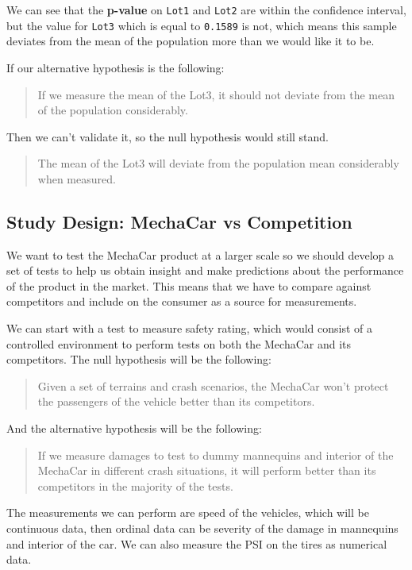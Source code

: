 \documentclass[11pt]{article}
\begin{document}
We can see that the \textbf{p-value} on \texttt{Lot1} and \texttt{Lot2} are within the confidence interval, but the value for \texttt{Lot3} which is equal to \texttt{0.1589} is not, which means this sample deviates from the mean of the population more than we would like it to be.

If our alternative hypothesis is the following:

\begin{quote}
If we measure the mean of the Lot3, it should not deviate from the mean of the population considerably.
\end{quote}

Then we can't validate it, so the null hypothesis would still stand.

\begin{quote}
The mean of the Lot3 will deviate from the population mean considerably when measured.
\end{quote}

\subsection{Study Design: MechaCar vs Competition}
\label{sec:org7ab7dfe}


We want to test the MechaCar product at a larger scale so we should develop a set of tests to help us obtain insight and make predictions about the performance of the product in the market. This means that we have to compare against competitors and include on the consumer as a source for measurements.

We can start with a test to measure safety rating, which would consist of a controlled environment to perform tests on both the MechaCar and its competitors. The null hypothesis will be the following:

\begin{quote}
Given a set of terrains and crash scenarios, the MechaCar won't protect the passengers of the vehicle better than its competitors.
\end{quote}

And the alternative hypothesis will be the following:

\begin{quote}
If we measure damages to test to dummy mannequins and interior of the MechaCar in different crash situations, it will perform better than its competitors in the majority of the tests.
\end{quote}

The measurements we can perform are speed of the vehicles, which will be continuous data, then ordinal data can be severity of the damage in mannequins and interior of the car. We can also measure the PSI on the tires as numerical data.
\end{document}
